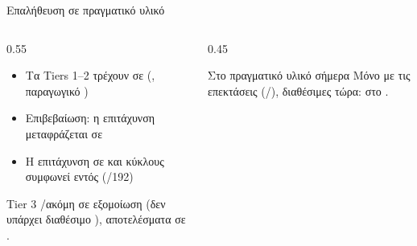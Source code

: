 \begin{frame}{Επαλήθευση σε πραγματικό υλικό}
  \begin{columns}[T,onlytextwidth]
    \begin{column}{0.55\textwidth}
      \begin{itemize}
        \item Τα Tiers 1--2 τρέχουν σε  (, παραγωγικό )
        \item Επιβεβαίωση: η επιτάχυνση \instret μεταφράζεται σε 
        \item Η επιτάχυνση σε \instret και κύκλους συμφωνεί εντός  (/192)
      \end{itemize}
      \vspace{0.4em}
      \begin{block}{Tier 3}
        \Zvbc/\Zvbb ακόμη σε εξομοίωση (δεν υπάρχει διαθέσιμο ), αποτελέσματα σε \instret.
      \end{block}
    \end{column}
    \begin{column}{0.45\textwidth}
      \begin{exampleblock}{Στο πραγματικό υλικό σήμερα}
        Μόνο με τις  επεκτάσεις (\Zbc/\Zbb), διαθέσιμες τώρα:  στο .
      \end{exampleblock}
    \end{column}
  \end{columns}
\end{frame}